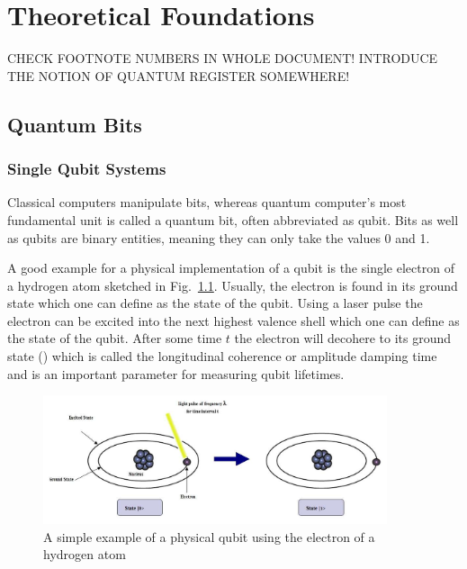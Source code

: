 \chapter{Theoretical Foundations}\label{sec:theory}

CHECK FOOTNOTE NUMBERS IN WHOLE DOCUMENT!
INTRODUCE THE NOTION OF QUANTUM REGISTER SOMEWHERE!
\section{Quantum Bits}
\label{subsec:qubits}

\subsection{Single Qubit Systems}
\label{subsubsec:qubits}
Classical computers manipulate bits, whereas quantum computer's most fundamental unit is called a quantum bit, often abbreviated as qubit. Bits as well as qubits are binary entities, meaning they can only take the values 0 and 1.

A good example for a physical implementation of a qubit is the single electron of a hydrogen atom sketched in Fig.~\ref{img:qubitatom}. Usually, the electron is found in its ground state which one can define as the \0 state of the qubit. Using a laser pulse the electron can be excited into the next highest valence shell which one can define as the \1 state of the qubit. After some time $t$ the electron will decohere to its ground state (\0) which is called the longitudinal coherence or amplitude damping time and is an important parameter for measuring qubit lifetimes.

\begin{figure}[!ht]
       \centering
       \includegraphics[width=0.9\textwidth]{img/qubitimplementation.jpeg}
       \caption{\label{img:qubitatom} A simple example of a physical qubit using the electron of a hydrogen atom}
\end{figure}

